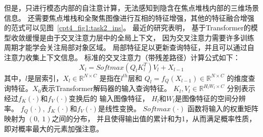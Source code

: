 但是，只进行模态内部的自注意计算，无法感知到隐含在焦点堆栈内部的三维场景信息。
还需要焦点堆栈和全聚焦图像进行互相的特征增强，其他的特征融合增强的范式可以见图~\ref{cpt4_fig1:task2_ins}。
最近的研究表明，
基于Transformer的模型收敛缓慢是由于交叉注意力层中的全局上下文，
因为交叉注意力需要许多训练周期才能学会关注局部对象区域。
局部特征足以更新查询特征，并且可以通过自注意力收集上下文信息。
标准的交叉注意力（带残差路径）计算公式如下：
\begin{equation}
	X_{l}=Softmax(Q_{l}K_{l}^{T})V_{l} + X_{l-1}
\end{equation}
其中，$l$是层索引，$X_{l} \in \mathbb{R}^{N\times C}$
是指在$l^{th}$层和
$ Q_{l} = f_{Q} \left ( X_{l-1} \right ) \in \mathbb{R}^{N \times C} $
的维度查询特征。$X_{0}$表示Transformer解码器的输入查询特征。
$K_{l},V_{l} \in \mathbb{R}^{H_{l}W_{l} \times C}$
分别表示经过$f_{K}(\cdot) $和$ f_{V}( \cdot )$变换后的
输入图像特征，
$H_{l}$和$W_{l}$是图像特征的空间分辨率。
$f_{Q} (\cdot),~f_{K}(\cdot) $和$ f_{V}(\cdot) $是线性变换。
$ Softmax(\cdot) $ 函数将输入的权重矩阵映射为 $(0,~1)$之间的分布，
并且使得输出值的累计和为1，从而满足概率性质，即对概率最大的元素加强注意。























